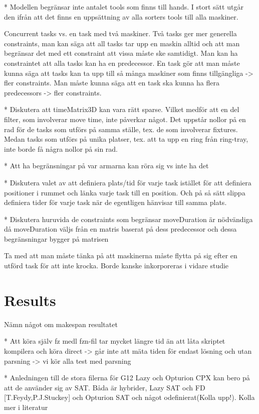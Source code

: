 * Modellen begränsar inte antalet tools som finns till hands. I stort sätt utgår den ifrån att det finns en uppsättning av alla sorters tools till alla maskiner.

Concurrent tasks vs. en task med två maskiner.
Två tasks ger mer generella constraints, man kan säga att all tasks tar upp en maskin alltid och att man begränsar det med ett constraint att vissa måste ske samtidigt. Man kan ha constraintet att alla tasks kan ha en predecessor.
En task gör att man måste kunna säga att tasks kan ta upp till så många maskiner som finns tillgängliga -> fler constraints. Man måste kunna säga att en task ska kunna ha flera predecessors -> fler constraints.

* Diskutera att timeMatrix3D kan vara rätt sparse. Vilket medför att en del filter, som involverar move time, inte påverkar något. Det uppstår nollor på en rad för de tasks som utförs på samma ställe, tex. de som involverar fixtures. Medan tasks som utförs på unika platser, tex. att ta upp en ring från ring-tray, inte borde få några nollor på sin rad.

* Att ha begränsningar på var armarna kan röra sig vs inte ha det

* Diskutera valet av att definiera plats/tid för varje task istället för att definiera positioner i rummet och länka varje task till en position. Och på så sätt slippa definiera tider för varje task när de egentligen hänvisar till samma plats.

* Diskutera huruvida de constraints som begränsar moveDuration är nödvändiga då moveDuration väljs från en matris baserat på dess predecessor och dessa begränsningar bygger på matrisen

Ta med att man måste tänka på att maskinerna måste flytta på sig efter en utförd task för att inte krocka. Borde kanske inkorporeras i vidare studie


\section{Results}
Nämn något om makespan resultatet

* Att köra själv fz medl fzn-fil tar mycket längre tid än att låta skriptet kompilera och köra direct -> går inte att mäta tiden för endast lösning och utan parsning -> vi kör alla test med parsning

* Anledningen till de stora filerna för G12 Lazy och Opturion CPX kan bero på att de använder sig av SAT. Båda är hybrider, Lazy SAT och FD [T.Feydy,P.J.Stuckey] och Opturion SAT och något odefinierat(Kolla upp!). Kolla mer i literatur

